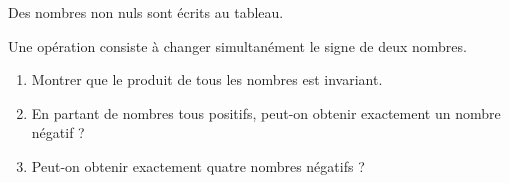 Des nombres non nuls sont écrits au tableau.

Une opération consiste à changer simultanément le signe de deux nombres.
\begin{enumerate}
  \item Montrer que le produit de tous les nombres est invariant.
  \item En partant de nombres tous positifs, peut-on obtenir exactement un
  nombre négatif ?
  \item Peut-on obtenir exactement quatre nombres négatifs ?
\end{enumerate}
